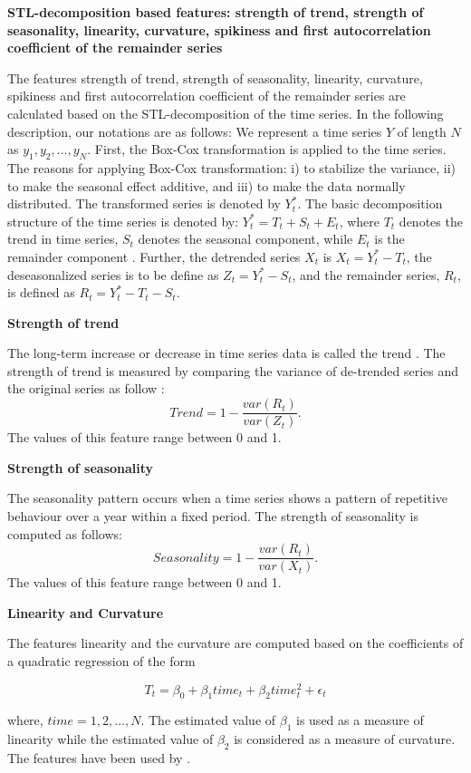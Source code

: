\documentclass[11pt,a4paper,]{article}
\theoremstyle{definition}
\theoremstyle{definition}
\theoremstyle{definition}
\theoremstyle{remark}
\begin{document}
\textbf{STL-decomposition based features: strength of trend, strength of
seasonality, linearity, curvature, spikiness and first autocorrelation
coefficient of the remainder series}

The features strength of trend, strength of seasonality, linearity,
curvature, spikiness and first autocorrelation coefficient of the
remainder series are calculated based on the STL-decomposition of the
time series. In the following description, our notations are as follows:
We represent a time series \(Y\) of length \(N\) as
\(y_1, y_2, \dots,y_N\). First, the Box-Cox transformation is applied to
the time series. The reasons for applying Box-Cox transformation: i) to
stabilize the variance, ii) to make the seasonal effect additive, and
iii) to make the data normally distributed. The transformed series is
denoted by \(Y_{t}^*\). The basic decomposition structure of the time
series is denoted by: \(Y_t^*=T_t+S_t+E_t\), where \(T_t\) denotes the
trend in time series, \(S_t\) denotes the seasonal component, while
\(E_t\) is the remainder component \autocite{cleveland1990stl}. Further,
the detrended series \(X_t\) is \(X_t=Y_t^*-T_t\), the deseasonalized
series is to be define as \(Z_t=Y_t^*-S_t\), and the remainder series,
\(R_t\), is defined as \(R_t=Y_t^*-T_t-S_t\).

\textbf{Strength of trend}

The long-term increase or decrease in time series data is called the
trend \autocite{hyndman2014forecasting}. The strength of trend is
measured by comparing the variance of de-trended series and the original
series as follow \autocite{wang2009rule}: \[
    Trend =1- \frac{var(R_{t})}{var(Z_{t})}.
\] The values of this feature range between 0 and 1.

\textbf{Strength of seasonality}

The seasonality pattern occurs when a time series shows a pattern of
repetitive behaviour over a year within a fixed period. The strength of
seasonality is computed as follows\autocite{wang2009rule}: \[
    Seasonality =1- \frac{var(R_{t})}{var(X_{t})}.
\]The values of this feature range between 0 and 1.

\textbf{Linearity and Curvature}

The features linearity and the curvature are computed based on the
coefficients of a quadratic regression of the form

\[T_t=\beta_0+\beta_1time_t+\beta_2time_t^2+\epsilon_t\]

where, \(time=1, 2, \dots,N\). The estimated value of \(\beta_1\) is
used as a measure of linearity while the estimated value of \(\beta_2\)
is considered as a measure of curvature. The features have been used by
\textcite{hyndman2015large}.
\end{document}
